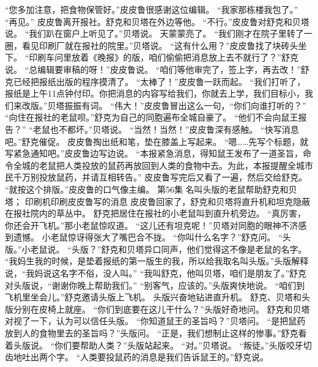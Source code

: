 \documentclass[a4paper,12pt,UTF8,twoside]{ctexbook}
\begin{document}
        “您多加注意，把食物保管好。”皮皮鲁很感谢这位编辑。 
        “我家那栋楼我包了。” 
        “再见。” 
        皮皮鲁离开报社。舒克和贝塔在外边等他。 
        “不行。”皮皮鲁对舒克和贝塔说。 
        “我们趴在窗户上听见了。”贝塔说。 
        天蒙蒙亮了。 
        “我们刚才在院子里转了一圈，看见印刷厂就在报社的院里。”贝塔说。 
        “这有什么用？”皮皮鲁找了块砖头坐下。 
        “印刷车问里放着《晚报》的版，咱们偷偷把消息放上去不就行了？”舒克说。 
        “总编辑要审稿的呀！”皮皮鲁说。 
        “咱们等他审完了，签上字，再去改！”舒克已经把报纸出版的程序摸清了。 
        “太棒了！”皮皮鲁一跃而起。 
        “我们打听了，报纸是上午11点钟付印。你把消息的内容写给我们，你就去上学，我们目标小，我们来改版。”贝塔振振有词。 
        “伟大！”皮皮鲁冒出这么一句，“你们向谁打听的？” 
        “向住在报社的老鼠呗。”舒克为自己的同胞遍布全城自豪了。 
        “他们不会向鼠王报告？” 
        “老鼠也不都坏。”贝塔说。 
        “当然！当然！”皮皮鲁深有感触。 
        “快写消息吧。”舒克催促。 
        皮皮鲁掏出纸和笔，垫在膝盖上写起来。 
        “嗯……先写个标题，就写紧急通知吧。”皮皮鲁边写边说。 
        “本报紧急消息，得知鼠王发布了一道圣旨，命令全城的老鼠把人类投放的鼠药再放回到人类的食物中去。为此，本报提醒全城市民千万别投放鼠药，并请互相转告。” 
        皮皮鲁写完后又看了一遍，然后交给舒克。 
        “就按这个排版。”皮皮鲁的口气像主编。   第56集 
        名叫头版的老鼠帮助舒克和贝塔； 
        印刷机印刷皮皮鲁写的消息   
        皮皮鲁回家了，舒克和贝塔将直升机和坦克隐蔽在报社院内的草丛中。 
        舒克把居住在报社的小老鼠叫到直升机旁边。 
        “真厉害，你还会开飞机。”那小老鼠惊叹道。 
        “这儿还有坦克呢！”贝塔对同胞的眼神不济感到遗憾。 
        小老鼠惊讶得张大了嘴巴合不拢。 
        “你叫什么名字？”舒克问。 
        “头版。”小老鼠说。 
        “头版？”舒克和贝塔异口同声，他们觉得这不像是老鼠的名字。 
        “我妈生我的时候，是垫着报纸的第一版生的我，所以给我取名叫头版。”头版解释说，“我妈说这名字不俗，没人叫。” 
        “我叫舒克，他叫贝塔，咱们是朋友了。”舒克对头版说，“谢谢你晚上帮助我们。” 
        “别客气，应该的。”头版爽快地说。 
        “咱们到飞机里坐会儿。”舒克邀请头版上飞机。 
        头版兴奋地钻进直升机。 
        舒克、贝塔和头版分别在皮椅上就座。 
        “你们到底要在这儿干什么？”头版好奇地问。 
        舒克和贝塔对视了一下，认为可以信任头版。 
        “你知道鼠王的圣旨吗？”贝塔问。 
        “是把鼠药放到人的食物里去的圣旨吗？”头版问。 
        “正是，我们想制止这样的惨事。”舒克看着头版说。 
        “你们要帮助人类？”头版站起来。 
        “对。”贝塔说。 
        “叛徒。”头版咬牙切齿地吐出两个字。 
        “人类要投鼠药的消息是我们告诉鼠王的。”舒克说。 
\end{document}
